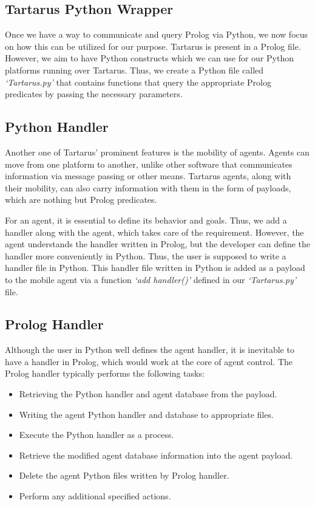\subsection{Tartarus Python Wrapper}
Once we have a way to communicate and query Prolog via Python, we now focus on how this can be utilized for our purpose. Tartarus is present in a Prolog file. However, we aim to have Python constructs which we can use for our Python platforms running over Tartarus. Thus, we create a Python file called \textit{`Tartarus.py'} that contains functions that query the appropriate Prolog predicates by passing the necessary parameters.

\subsection{Python Handler}
Another one of Tartarus' prominent features is the mobility of agents. Agents can move from one platform to another, unlike other software that communicates information via message passing or other means. Tartarus agents, along with their mobility, can also carry information with them in the form of payloads, which are nothing but Prolog predicates.
\par For an agent, it is essential to define its behavior and goals. Thus, we add a handler along with the agent, which takes care of the requirement. However, the agent understands the handler written in Prolog, but the developer can define the handler more conveniently in Python. Thus, the user is supposed to write a handler file in Python. This handler file written in Python is added as a payload to the mobile agent via a function \textit{`add handler()'} defined in our \textit{`Tartarus.py'} file.

\subsection{Prolog Handler} \label{Prolog Handler}
Although the user in Python well defines the agent handler, it is inevitable to have a handler in Prolog, which would work at the core of agent control. The Prolog handler typically performs the following tasks:
\begin{itemize}
    \item Retrieving the Python handler and agent database from the payload.
    \item Writing the agent Python handler and database to appropriate files.
    \item Execute the Python handler as a process.
    \item Retrieve the modified agent database information into the agent payload.
    \item Delete the agent Python files written by Prolog handler.
    \item Perform any additional specified actions.
\end{itemize}

